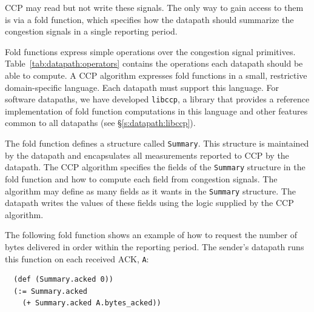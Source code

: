 
CCP may read but not write these signals. The only way to gain access to them is via a fold function, which specifies how the datapath should summarize the congestion signals in a single reporting period. 
 
 
%

Fold functions express simple operations over the congestion signal primitives. Table~\ref{tab:datapath:operators} contains the operations each datapath should be able to compute. A CCP algorithm expresses fold functions in a small, restrictive domain-specific language. Each datapath must support this language. For software datapaths, we have developed \texttt{libccp}, a library that provides a reference implementation of fold function computations in this language and other features common to all datapaths (see \S\ref{s:datapath:libccp}). 
 
The fold function defines a structure called \texttt{Summary}. This structure is maintained by the datapath and encapsulates all measurements reported to CCP by the datapath. The CCP algorithm specifies the fields of the \texttt{Summary} structure in the fold function and how to compute each field from congestion signals. The algorithm may define as many fields as it wants in the \texttt{Summary} structure. The datapath writes the values of these fields using the logic supplied by the CCP algorithm.
 
The following fold function shows an example of how to request the number of bytes delivered in order within the reporting period. The sender's datapath runs this function on each received ACK, \texttt{A}:
 
\begin{verbatim}
  (def (Summary.acked 0))
  (:= Summary.acked
    (+ Summary.acked A.bytes_acked))
\end{verbatim}
 
 
